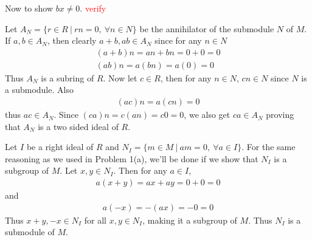 \documentclass[12pt]{exam}
\theoremstyle{plain} %
\theoremstyle{definition} %
\theoremstyle{remark} %
\begin{document}
\begin{questions}
\begin{solution}
\begin{parts}
      Now to show $bx \neq 0$. \textcolor{red}{verify}
    \end{parts}
  \end{solution}

  \question
  \begin{solution}
    Let $A_N = \{ r \in R \ | \ rn = 0, \ \forall n \in N \}$ be the
    annihilator of the submodule $N$ of $M$. If $a, b \in A_N$, then
    clearly $a + b, ab \in A_N$ since for any $n \in N$
    \begin{align*}
      (a + b)n = an + bn = 0 + 0 = 0 \\
      (ab)n = a(bn) = a(0) = 0
    \end{align*}
    Thus $A_N$ is a subring of $R$. Now let $c \in R$, then for any
    $n \in N$, $cn \in N$ since $N$ is a submodule. Also
    \begin{align*}
      (ac)n = a(cn) = 0
    \end{align*}
    thus $ac \in A_N$. Since $(ca)n = c(an) = c0 = 0$, we also get
    $ca \in A_N$ proving that $A_N$ is a two sided ideal of $R$.
  \end{solution}

  \question
  \begin{solution}
    Let $I$ be a right ideal of $R$ and $N_I = \{ m \in M  \ | \  am
    = 0, \ \forall a \in I \}$. For the same reasoning as we used in
    Problem 1(a), we'll be done if we show that $N_I$ is a subgroup
    of $M$. Let $x, y \in N_I$. Then for any $a \in I$,
    \begin{align*}
      a(x + y) = ax + ay = 0 + 0 = 0
    \end{align*}
    and
    \begin{align*}
      a(-x) = -(ax) = -0 = 0
    \end{align*}
    Thus $x + y, -x \in N_I$ for all $x, y \in N_I$, making it a
    subgroup of $M$. Thus $N_I$ is a submodule of $M$.
  \end{solution}

  \question
  \begin{solution}
\end{solution}
\end{questions}
\end{document}
